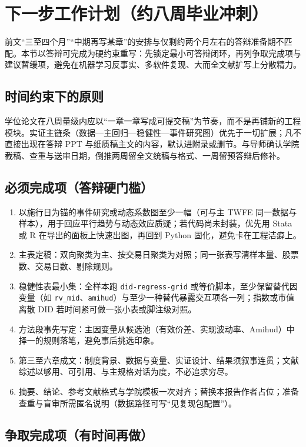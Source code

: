\documentclass[UTF8, a4paper, 12pt]{ctexart}
\newcommand{\id}[1]{{\footnotesize\nolinkurl{#1}}}
\begin{document}
\section{下一步工作计划（约八周毕业冲刺）}

前文“三至四个月”“中期再写某章”的安排与仅剩约两个月左右的答辩准备期不匹配。本节以答辩可完成为硬约束重写：先锁定最小可答辩闭环，再列争取完成项与建议暂缓项，避免在机器学习反事实、多软件复现、大而全文献扩写上分散精力。

\subsection{时间约束下的原则}

学位论文在八周量级内应以“一章一章写成可提交稿”为节奏，而不是再铺新的工程模块。实证主链条（数据—主回归—稳健性—事件研究图）优先于一切扩展；凡不直接出现在答辩 PPT 与纸质稿主文的内容，默认进附录或删节。与导师确认学院截稿、查重与送审日期，倒推两周留全文统稿与格式、一周留预答辩后修补。

\subsection{必须完成项（答辩硬门槛）}

\begin{enumerate}[leftmargin=2em]
  \item 以施行日为锚的事件研究或动态系数图至少一幅（可与主 TWFE 同一数据与样本），用于回应平行趋势与动态效应质疑；若代码尚未封装，优先用 Stata 或 R 在导出的面板上快速出图，再回到 Python 固化，避免卡在工程洁癖上。
  \item 主表定稿：双向聚类为主、按交易日聚类为对照；同一张表写清样本量、股票数、交易日数、剔除规则。
  \item 稳健性表最小集：全样本跑 \id{did-regress-grid} 或等价脚本，至少保留替代因变量（如 \id{rv_mid}、\id{amihud}）与至少一种替代暴露交互项各一列；指数或市值离散 DID 若时间紧可做一张小表或脚注级对照。
  \item 方法段事先写定：主因变量从候选池（有效价差、实现波动率、Amihud）中择一的规则落笔，避免事后挑选印象。
  \item 第三至六章成文：制度背景、数据与变量、实证设计、结果须叙事连贯；文献综述以够用、可引用、与主规格对话为度，不必追求穷尽。
  \item 摘要、结论、参考文献格式与学院模板一次对齐；替换本报告作者占位；准备查重与盲审所需匿名说明（数据路径可写“见复现包配置”）。
\end{enumerate}

\subsection{争取完成项（有时间再做）}
\end{document}
